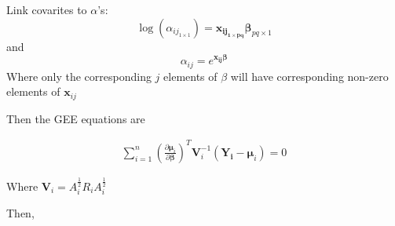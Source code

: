 \documentclass{article}
\begin{document}
Link covarites to $\alpha$'s:
$$\log(\alpha_{ij_{1 \times 1}}) = \mathbf{x_{ij_{1 \times pq}}}\boldsymbol\beta_{pq \times 1}$$
and
$$\alpha_{ij} = e^{\mathbf{x_{ij}}\boldsymbol\beta}$$
Where only the corresponding $j$ elements of $\beta$ will have corresponding non-zero elements of $\mathbf{x}_{ij}$

\newpage

Then the GEE equations are

\begin{align*}
  \sum_{i = 1}^n  \left(\frac{\partial  \boldsymbol\mu_i }{\partial \boldsymbol\beta }\right)^T\mathbf{V}_i^{-1}(\mathbf{Y_i} - \boldsymbol\mu_i) = 0
\end{align*}

Where $\boldsymbol V_i = A_i^{\tfrac{1}{2}}R_iA_i^{\tfrac{1}{2}}$

Then,
\end{document}

